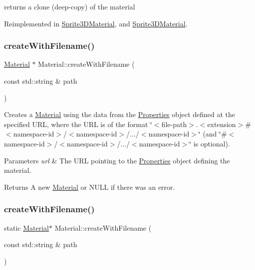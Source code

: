 returns a clone (deep-\/copy) of the material 

Reimplemented in \hyperlink{classSprite3DMaterial_a2ce762d8a3abe91eb5abe2df95aa63f4}{Sprite3\+D\+Material}, and \hyperlink{classSprite3DMaterial_ac812fcb53172b407d4401d5242ce8d4e}{Sprite3\+D\+Material}.

\mbox{\label{classMaterial_a1244126a35a456342473cd18ce05c86f}} 
\subsubsection{\texorpdfstring{create\+With\+Filename()}{createWithFilename()}\hspace{0.1cm}{\footnotesize\ttfamily [1/2]}}
{\footnotesize\ttfamily \hyperlink{classMaterial}{Material} $\ast$ Material\+::create\+With\+Filename (\begin{DoxyParamCaption}\item[{const std\+::string \&}]{path }\end{DoxyParamCaption})\hspace{0.3cm}{\ttfamily [static]}}

Creates a \hyperlink{classMaterial}{Material} using the data from the \hyperlink{classProperties}{Properties} object defined at the specified U\+RL, where the U\+RL is of the format \char`\"{}$<$file-\/path$>$.$<$extension$>$\#$<$namespace-\/id$>$/$<$namespace-\/id$>$/.../$<$namespace-\/id$>$\char`\"{} (and \char`\"{}\#$<$namespace-\/id$>$/$<$namespace-\/id$>$/.../$<$namespace-\/id$>$\char`\"{} is optional).


\begin{DoxyParams}{Parameters}
{\em url} & The U\+RL pointing to the \hyperlink{classProperties}{Properties} object defining the material.\\
\hline
\end{DoxyParams}
\begin{DoxyReturn}{Returns}
A new \hyperlink{classMaterial}{Material} or N\+U\+LL if there was an error. 
\end{DoxyReturn}
\mbox{\label{classMaterial_aeebb1e32ac992f8d8f79c6a7c98a4fb1}} 
\subsubsection{\texorpdfstring{create\+With\+Filename()}{createWithFilename()}\hspace{0.1cm}{\footnotesize\ttfamily [2/2]}}
{\footnotesize\ttfamily static \hyperlink{classMaterial}{Material}$\ast$ Material\+::create\+With\+Filename (\begin{DoxyParamCaption}\item[{const std\+::string \&}]{path }\end{DoxyParamCaption})\hspace{0.3cm}{\ttfamily [static]}}


